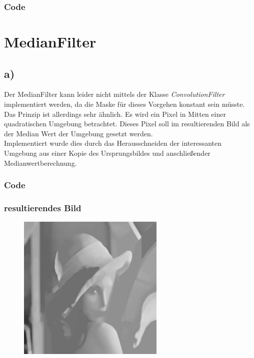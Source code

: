 \documentclass[12pt,german]{article}
\begin{document}
\subsubsection{Code}





\newpage
\section{MedianFilter}
\subsection{a)}Der MedianFilter kann leider nicht mittels der Klasse \textit{ConvolutionFilter} implementiert werden, da die Maske für dieses Vorgehen konstant sein müsste. Das Prinzip ist allerdings sehr ähnlich. Es wird ein Pixel in Mitten einer quadratischen Umgebung betrachtet. Dieses Pixel soll im resultierenden Bild als der Median Wert der Umgebung gesetzt werden. \\
Implementiert wurde dies durch das Herausschneiden der interessanten Umgebung aus einer Kopie des Ursprungsbildes und anschließender Medianwertberechnung. 
\subsubsection{Code}

\subsubsection{resultierendes Bild}
\begin{figure}[h]
	\includegraphics[width=7cm]{../testData/Results/median.jpg}
\end{figure}
\end{document}
